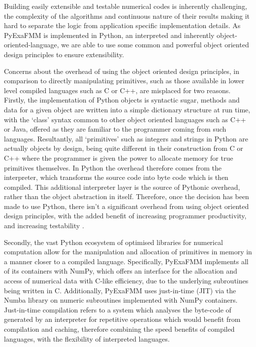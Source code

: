 Building easily extensible and testable numerical codes is inherently challenging,
the complexity of the algorithms and continuous nature of their results making it hard to separate the logic from application
specific implementation details. As \gls{PyExaFMM} is implemented in Python, an
\gls{interpreted} and inherently \gls{object-oriented-language}, we are able to use some common and powerful
object oriented design principles to ensure extensibility.

Concerns about the overhead of using the object oriented design principles, in comparison to directly manipulating
primitives, such as those available in lower level compiled languages such as C
or C++, are misplaced for two reasons. Firstly, the implementation of Python objects
is syntactic sugar, methods and data for a given object are written into
a simple dictionary structure at run time, with the `class' syntax common to other
object oriented languages such as C++ or Java, offered as they are familiar to
the programmer coming from such languages. Resultantly, all `primitives' such as
integers and strings in Python are actually objects by design, being quite different
in their construction from C or C++ where the programmer is given the power to
allocate memory for true primitives themselves. In Python the overhead therefore
comes from the interpreter, which transforms the source code into byte code which
is then compiled. This additional interpreter layer is the source of Pythonic overhead,
rather than the object abstraction in itself. Therefore, once the decision has
been made to use Python, there isn't a significant overhead from using object
oriented design principles, with the added benefit of increasing programmer
productivity, and increasing testability \cite{Ramalho:2015:Oreilly}.

Secondly, the vast Python ecosystem of optimised libraries for numerical
computation allow for the manipulation and
allocation of primitives in memory in a manner closer to a compiled language.
Specifically, \gls{PyExaFMM} implements all of its containers with NumPy, which
offers an interface for the allocation and access of numerical data with C-like
efficiency, due to the underlying subroutines being written in C. Additionally,
\gls{PyExaFMM} uses just-in-time (\gls{JIT}) via the Numba library on
numeric subroutines implemented with NumPy containers. Just-in-time compilation
refers to a system which analyses the byte-code of generated by an interpreter
for repetitive operations which would benefit from compilation and caching, therefore
combining the speed benefits of compiled languages, with the flexibility of interpreted
languages.

